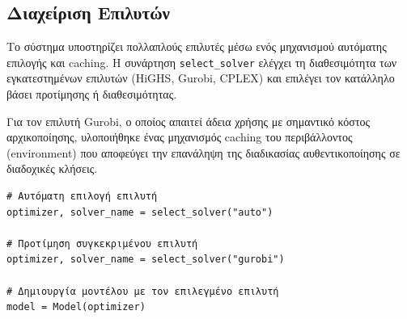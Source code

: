 \subsection{Διαχείριση Επιλυτών}
\label{subsec:solver-management}

Το σύστημα υποστηρίζει πολλαπλούς επιλυτές μέσω ενός μηχανισμού αυτόματης επιλογής και caching. Η συνάρτηση \texttt{select\_solver} ελέγχει τη διαθεσιμότητα των εγκατεστημένων επιλυτών (HiGHS, Gurobi, CPLEX) και επιλέγει τον κατάλληλο βάσει προτίμησης ή διαθεσιμότητας.

Για τον επιλυτή Gurobi, ο οποίος απαιτεί άδεια χρήσης με σημαντικό κόστος αρχικοποίησης, υλοποιήθηκε ένας μηχανισμός caching του περιβάλλοντος (environment) που αποφεύγει την επανάληψη της διαδικασίας αυθεντικοποίησης σε διαδοχικές κλήσεις.

\begin{samepage}
\begin{verbatim}
# Αυτόματη επιλογή επιλυτή
optimizer, solver_name = select_solver("auto")

# Προτίμηση συγκεκριμένου επιλυτή
optimizer, solver_name = select_solver("gurobi")

# Δημιουργία μοντέλου με τον επιλεγμένο επιλυτή
model = Model(optimizer)
\end{verbatim}
\end{samepage}
